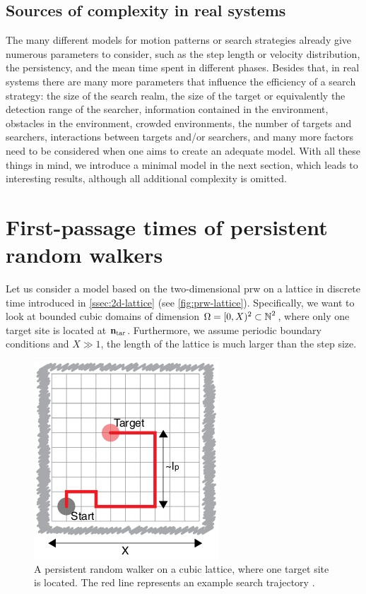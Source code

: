\subsection{Sources of complexity in real systems}
The many different models for motion patterns or search strategies already give numerous parameters to consider, such as \eg the step length or velocity distribution, the persistency, and the mean time spent in different phases. Besides that, in real systems there are many more parameters that influence the efficiency of a search strategy: the size of the search realm, the size of the target or equivalently the detection range of the searcher, information contained in the environment, obstacles in the environment, crowded environments, the number of targets and searchers, interactions between targets and/or searchers, and many more factors need to be considered when one aims to create an adequate model. With all these things in mind, we introduce a minimal model in the next section, which leads to interesting results, although all additional complexity is omitted.

\section{First-passage times of persistent random walkers}
Let us consider a model based on the two-dimensional \ac{prw} on a lattice in discrete time introduced in \autoref{ssec:2d-lattice} (see \autoref{fig:prw-lattice}). Specifically, we want to look at bounded cubic domains of dimension $\Omega = [0,X)^2 \subset \operatorname{\mathbb{N}}^2$, where only one target site is located at $\mathbf{n}_\textrm{tar}$. Furthermore, we assume periodic boundary conditions and $X \gg 1$, \ie the length of the lattice is much larger than the step size.

\begin{figure}[bth]
 \myfloatalign
 \includegraphics[width=0.4\linewidth]{gfx/prw-lattice}
 \caption[Persistent random walk on a lattice]{A persistent random walker on a cubic lattice, where one target site is located. The red line represents an example search trajectory \cite{tejedor:2012}.}\label{fig:prw-lattice}
\end{figure}

